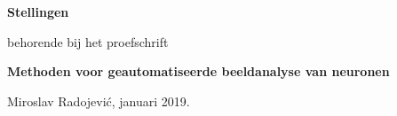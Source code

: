 \documentclass[10pt]{report}%
\begin{document}
\pagestyle{empty}

\setlength{\leftmargini}{0em}

\begin{center}
  {\Large\bf Stellingen}

  \medskip

  behorende bij het proefschrift

  \medskip

  {\large\bf  Methoden voor geautomatiseerde beeldanalyse van neuronen}

  \medskip

  Miroslav Radojevi\'{c}, januari 2019.
\end{center}

\bigskip
\small
\end{document}
